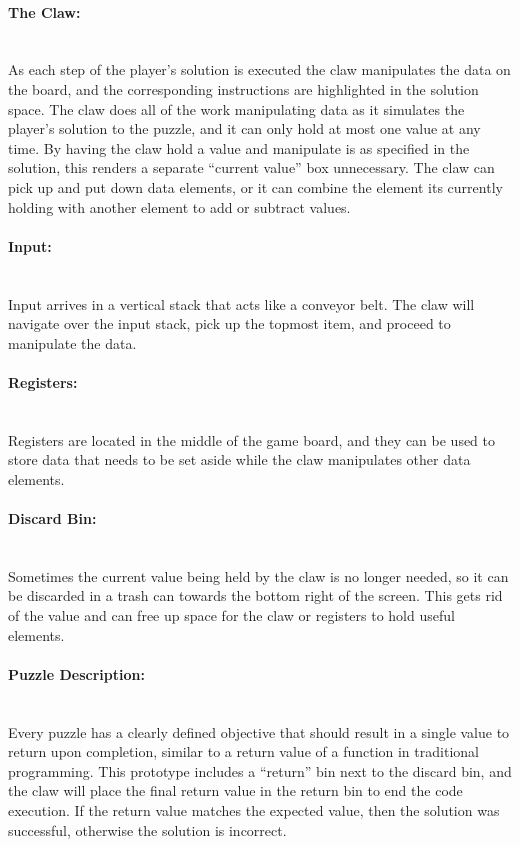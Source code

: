 \paragraph{The Claw:} ~\\
As each step of the player's solution is executed the claw manipulates the data on the board, 
and the corresponding instructions are highlighted in the solution space. The claw does all of 
the work manipulating data as it simulates the player's solution to the puzzle, and it can only 
hold at most one value at any time. By having the claw hold a value and manipulate is as 
specified in the solution, this renders a separate ``current value'' box unnecessary. The claw 
can pick up and put down data elements, or it can combine the element its currently holding 
with another element to add or subtract values.\\

\paragraph{Input:} ~\\
Input arrives in a vertical stack that acts like a conveyor belt. The claw will navigate over the 
input stack, pick up the topmost item, and proceed to manipulate the data.\\

\paragraph{Registers:} ~\\
Registers are located in the middle of the game board, and they can be used to store data that 
needs to be set aside while the claw manipulates other data elements.\\

\paragraph{Discard Bin:} ~\\
Sometimes the current value being held by the claw is no longer needed, so it can be discarded 
in a trash can towards the bottom right of the screen. This gets rid of the value and can free up 
space for the claw or registers to hold useful elements.\\

\paragraph{Puzzle Description:} ~\\
Every puzzle has a clearly defined objective that should result in a single value to return upon 
completion, similar to a return value of a function in traditional programming. This prototype 
includes a ``return'' bin next to the discard bin, and the claw will place the final return value in 
the return bin to end the code execution. If the return value matches the expected value, then 
the solution was successful, otherwise the solution is incorrect.\\

